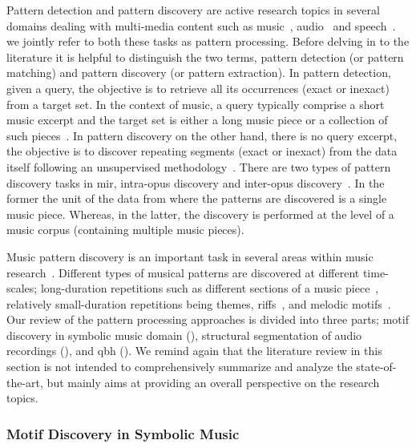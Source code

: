 Pattern detection and pattern discovery are active research topics in several domains dealing with multi-media content such as music~\citep{klapuri2010pattern}, audio~\citep{Herley2006} and speech~\citep{Park2008}. we jointly refer to both these tasks as pattern processing. Before delving in to the literature it is helpful to distinguish the two terms, pattern detection (or pattern matching) and pattern discovery (or pattern extraction). In pattern detection, given a query, the objective is to retrieve all its occurrences (exact or inexact) from a target set. In the context of music, a query typically comprise a short music excerpt and the target set is either a long music piece or a collection of such pieces~\citep{ghias1995query}. In pattern discovery on the other hand, there is no query excerpt, the objective is to discover repeating segments (exact or inexact) from the data itself following an unsupervised methodology~\citep{dannenberg2003pattern}. There are two types of pattern discovery tasks in \gls{mir}, intra-opus discovery and inter-opus discovery~\citep{conklin2001representation}. In the former the unit of the data from where the patterns are discovered is a single music piece. Whereas, in the latter, the discovery is performed at the level of a music corpus (containing multiple music pieces).

Music pattern discovery is an important task in several areas within music research~\cite{collins2011modeling,Conklin2010a,Serra2014,nieto2012compressing}. Different types of musical patterns are discovered at different time-scales; long-duration repetitions such as different sections of a music piece~\citep{serra2012unsupervised,Goto06TASLP}, relatively small-duration repetitions being themes, riffs~\citep{Hsu2001a}, and melodic motifs~\citep{collins2011improved}. Our review of the pattern processing approaches is divided into three parts; motif discovery in symbolic music domain (), structural segmentation of audio recordings (), and \gls{qbh} (). We remind again that the literature review in this section is not intended to comprehensively summarize and analyze the state-of-the-art, but mainly aims at providing an overall perspective on the research topics.


\subsubsection{Motif Discovery in Symbolic Music }
\label{sec:motif_in_symbolic_music}

